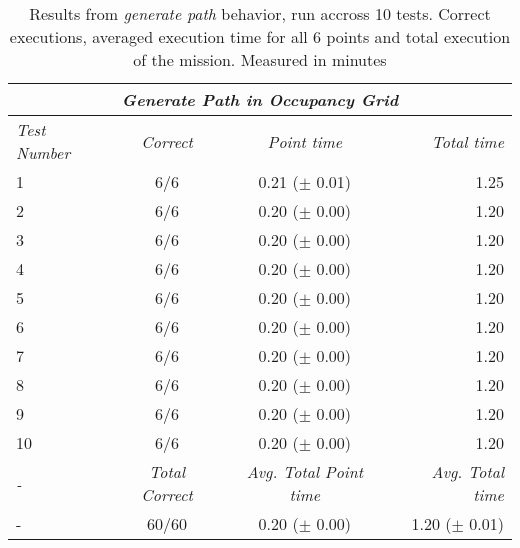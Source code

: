 \begin{table}[!h]
  \centering
  \begin{tabular}{lccr} \toprule
    \multicolumn{4}{c}{\textit{Generate Path in Occupancy Grid}}                        \\ \midrule
    \textit{Test Number} & \textit{Correct} & \textit{Point time} & \textit{Total time} \\ \midrule
      1 & 6/6 & 0.21 ($\pm$ 0.01) & 1.25 \\ \hline
      2 & 6/6 & 0.20 ($\pm$ 0.00) & 1.20 \\ \hline
      3 & 6/6 & 0.20 ($\pm$ 0.00) & 1.20 \\ \hline
      4 & 6/6 & 0.20 ($\pm$ 0.00) & 1.20 \\ \hline
      5 & 6/6 & 0.20 ($\pm$ 0.00) & 1.20 \\ \hline
      6 & 6/6 & 0.20 ($\pm$ 0.00) & 1.20 \\ \hline
      7 & 6/6 & 0.20 ($\pm$ 0.00) & 1.20 \\ \hline
      8 & 6/6 & 0.20 ($\pm$ 0.00) & 1.20 \\ \hline
      9 & 6/6 & 0.20 ($\pm$ 0.00) & 1.20 \\ \hline
      10 & 6/6 & 0.20 ($\pm$ 0.00) & 1.20 \\ \hline
      \textit{-} & \textit{Total Correct} & \textit{Avg. Total Point time} & \textit{Avg. Total time} \\ \midrule
      - & 60/60 & 0.20 ($\pm$ 0.00) & 1.20 ($\pm$ 0.01) \\ \bottomrule
      \hline
  \end{tabular}
  \caption{Results from \textit{generate path} behavior, run accross 10 tests. Correct executions, averaged execution time for all 6 points and total execution of the mission. Measured in minutes}
  \label{ch_5:table:generate_path_results}
\end{table}
